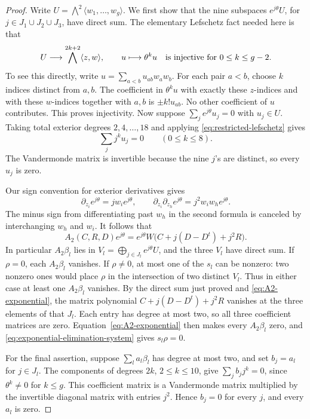 \documentclass[11pt]{article}
\numberwithin{equation}{section}
\theoremstyle{definition}
\theoremstyle{remark}
\begin{document}
\begin{proof}
Write $U=\bigwedge^2\langle w_1,\ldots,w_g\rangle$.
We first show that the nine subspaces $e^{j\theta}U$, for
$j\in J_1\cup J_2\cup J_3$, have direct sum.
The elementary Lefschetz fact needed here is that
\begin{equation}\label{eq:restricted-lefschetz}
 U\longrightarrow\bigwedge^{2k+2}\langle z,w\rangle,\qquad
 u\longmapsto\theta^ku
 \quad\hbox{is injective for }0\le k\le g-2.
\end{equation}
To see this directly, write $u=\sum_{a<b}u_{ab}w_aw_b$.
For each pair $a<b$, choose $k$ indices distinct from $a,b$.
The coefficient in $\theta^ku$ with exactly these $z$-indices and
with these $w$-indices together with $a,b$ is $\pm k!u_{ab}$.
No other coefficient of $u$ contributes.  This proves injectivity.
Now suppose $\sum_j e^{j\theta}u_j=0$ with $u_j\in U$.
Taking total exterior degrees $2,4,\ldots,18$ and applying
\eqref{eq:restricted-lefschetz} gives
\[
 \sum_j j^k u_j=0\qquad(0\le k\le8).
\]
The Vandermonde matrix is invertible because the nine $j$'s are
distinct, so every $u_j$ is zero.

Our sign convention for exterior derivatives gives
\[
 \partial_{z_i}e^{j\theta}=j w_i e^{j\theta},\qquad
 \partial_{z_i}\partial_{z_h}e^{j\theta}
       =j^2w_iw_he^{j\theta}.
\]
The minus sign from differentiating past $w_h$ in the second formula
is canceled by interchanging $w_h$ and $w_i$.
It follows that
\begin{equation}\label{eq:A2-exponential}
 A_2(C,R,D)e^{j\theta}
   =e^{j\theta}W\bigl(C+j(D-D^t)+j^2R\bigr).
\end{equation}
In particular $A_2\beta_l$ lies in
$V_l=\bigoplus_{j\in J_l}e^{j\theta}U$, and the three $V_l$ have
direct sum.  If $\rho=0$, each $A_2\beta_l$ vanishes.
If $\rho\ne0$, at most one of the $s_l$ can be nonzero: two nonzero
ones would place $\rho$ in the intersection of two distinct $V_l$.
Thus in either case at least one $A_2\beta_l$ vanishes.
By the direct sum just proved and \eqref{eq:A2-exponential}, the
matrix polynomial
$C+j(D-D^t)+j^2R$ vanishes at the three elements of that $J_l$.
Each entry has degree at most two, so all three coefficient matrices
are zero.  Equation~\eqref{eq:A2-exponential} then makes every
$A_2\beta_l$ zero, and \eqref{eq:exponential-elimination-system}
gives $s_l\rho=0$.

For the final assertion, suppose $\sum_l a_l\beta_l$ has degree at
most two, and set $b_j=a_l$ for $j\in J_l$.
The components of degrees $2k$, $2\le k\le10$, give
$\sum_j b_jj^k=0$, since $\theta^k\ne0$ for $k\le g$.
This coefficient matrix is a Vandermonde matrix multiplied by the
invertible diagonal matrix with entries $j^2$.
Hence $b_j=0$ for every $j$, and every $a_l$ is zero.
\end{proof}
\end{document}
